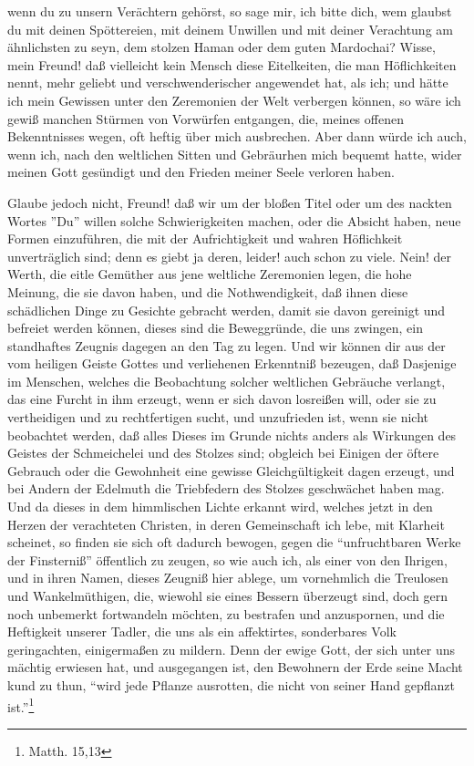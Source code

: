 wenn du zu unsern Verächtern gehörst, so sage mir, ich bitte dich, wem glaubst
du mit deinen Spöttereien, mit deinem Unwillen und mit deiner Verachtung am
ähnlichsten zu seyn, dem stolzen Haman oder dem guten Mardochai? Wisse, mein
Freund! daß vielleicht kein Mensch diese Eitelkeiten, die man Höflichkeiten
nennt, mehr geliebt und verschwenderischer angewendet hat, als ich; und hätte
ich mein Gewissen unter den Zeremonien der Welt verbergen können, so wäre ich
gewiß manchen Stürmen von Vorwürfen entgangen, die, meines offenen Bekenntnisses
wegen, oft heftig über mich ausbrechen. Aber dann würde ich auch, wenn ich, nach
den weltlichen Sitten und Gebräurhen mich bequemt hatte, wider meinen Gott
gesündigt und den Frieden meiner Seele verloren haben.

\medskip

Glaube jedoch nicht, Freund! daß wir um der bloßen Titel oder um des nackten
Wortes ''Du'' willen solche Schwierigkeiten machen, oder die Absicht haben, neue
Formen einzuführen, die mit der Aufrichtigkeit und wahren Höflichkeit
unverträglich sind; denn es giebt ja deren, leider! auch schon zu viele. Nein!
der Werth, die eitle Gemüther aus jene weltliche Zeremonien legen, die hohe
Meinung, die sie davon haben, und die Nothwendigkeit, daß ihnen diese
schädlichen Dinge zu Gesichte gebracht werden, damit sie davon gereinigt und
befreiet werden  können, dieses sind die Beweggründe, die uns zwingen, ein
standhaftes Zeugnis dagegen an den Tag zu legen. Und wir können dir aus der vom
heiligen Geiste Gottes und verliehenen Erkenntniß bezeugen, daß Dasjenige im
Menschen, welches die Beobachtung solcher weltlichen Gebräuche verlangt, das
eine Furcht in ihm erzeugt, wenn er sich davon losreißen will, oder sie zu
vertheidigen und zu rechtfertigen sucht, und unzufrieden ist, wenn sie nicht
beobachtet werden, daß alles Dieses im Grunde nichts anders als Wirkungen des
Geistes der Schmeichelei und des Stolzes sind; obgleich bei Einigen der öftere
Gebrauch oder die Gewohnheit eine gewisse Gleichgültigkeit dagen erzeugt, und
bei Andern der Edelmuth die Triebfedern des Stolzes geschwächet haben mag. Und
da dieses in dem himmlischen Lichte erkannt wird, welches jetzt in den Herzen
der verachteten Christen, in deren Gemeinschaft ich lebe, mit Klarheit scheinet,
so finden sie sich oft dadurch bewogen, gegen die "`unfruchtbaren Werke der
Finsterniß"' öffentlich zu zeugen, so wie auch ich, als einer von den Ihrigen,
und in ihren Namen, dieses Zeugniß hier ablege, um vornehmlich die Treulosen und
Wankelmüthigen, die, wiewohl sie eines Bessern überzeugt sind, doch gern noch
unbemerkt fortwandeln möchten, zu bestrafen und anzuspornen, und die Heftigkeit
unserer Tadler, die uns als ein affektirtes, sonderbares Volk geringachten,
einigermaßen zu mildern. Denn der ewige Gott, der sich unter uns mächtig
erwiesen hat, und ausgegangen ist, den Bewohnern der Erde seine Macht kund zu
thun, "`wird jede Pflanze ausrotten, die nicht von seiner Hand gepflanzt
ist."'\footnote{Matth. 15,13}


